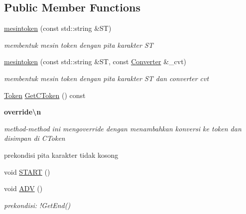 \subsection*{Public Member Functions}
\begin{DoxyCompactItemize}
\item 
\hyperlink{classmesintoken_aecc28dabdb54b87985b0ccd62f119f8f}{mesintoken} (const std\-::string \&S\-T)
\begin{DoxyCompactList}\small\item\em membentuk mesin token dengan pita karakter S\-T \end{DoxyCompactList}\item 
\hyperlink{classmesintoken_a36904a5bfe632c649790f47626ecd6cb}{mesintoken} (const std\-::string \&S\-T, const \hyperlink{class_converter}{Converter} \&\-\_\-cvt)
\begin{DoxyCompactList}\small\item\em membentuk mesin token dengan pita karakter S\-T dan converter cvt \end{DoxyCompactList}\end{DoxyCompactItemize}
{\bf }\par
\begin{DoxyCompactItemize}
\item 
\hyperlink{class_token}{Token} \hyperlink{classmesintoken_a996213e867abc8a7f20a06630df9ab89}{Get\-C\-Token} () const 
\end{DoxyCompactItemize}

\begin{Indent}{\bf override\textbackslash{}n}\par
{\em method-\/method ini mengoverride dengan menambahkan konversi ke token dan disimpan di C\-Token

prekondisi pita karakter tidak kosong }\begin{DoxyCompactItemize}
\item 
void \hyperlink{classmesintoken_a1a5b2f1c7ddd5f763a8f94d8e1c7a37c}{S\-T\-A\-R\-T} ()
\item 
void \hyperlink{classmesintoken_affa342e1600ea0fa9e6d6f40cd76919e}{A\-D\-V} ()
\begin{DoxyCompactList}\small\item\em prekondisi\-: !\-Get\-End() \end{DoxyCompactList}\end{DoxyCompactItemize}
\end{Indent}


